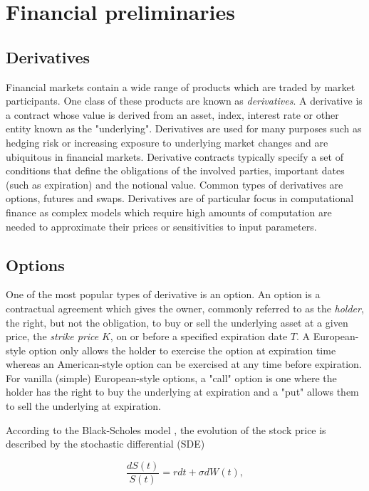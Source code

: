 \section{Financial preliminaries}
\subsection{Derivatives}
Financial markets contain a wide range of products which are traded by market participants. One class of these products are known as \textit{derivatives}. A derivative is a contract whose value is derived from an asset, index, interest rate or other entity known as the "underlying". Derivatives are used for many purposes such as hedging risk or increasing exposure to underlying market changes and are ubiquitous in financial markets. Derivative contracts typically specify a set of conditions that define the obligations of the involved parties, important dates (such as expiration) and the notional value. Common types of derivatives are options, futures and swaps. 
Derivatives are of particular focus in computational finance as complex models which require high amounts of computation are needed to approximate their prices or sensitivities to input parameters.

\subsection{Options}
One of the most popular types of derivative is an option. An option is a contractual agreement which gives the owner, commonly referred to as the \textit{holder}, the right, but not the obligation, to buy or sell the underlying asset at a given price, the \textit{strike price} \(K\), on or before a specified expiration date \(T\). A European-style option only allows the holder to exercise the option at expiration time whereas an American-style option can be exercised at any time before expiration. For vanilla (simple) European-style options, a "call" option is one where the holder has the right to buy the underlying at expiration and a "put" allows them to sell the underlying at expiration.

According to the Black-Scholes model \cite{blackscholes}, the evolution of the stock price is described by the stochastic differential (SDE)

\begin{equation} \label{eqn:BlackScholesSDE}
    \frac{dS(t)}{S(t)} = r dt + \sigma dW(t),
\end{equation}

